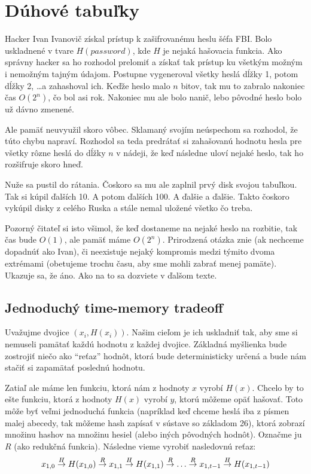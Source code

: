 \section{Dúhové tabuľky}

Hacker Ivan Ivanovič získal prístup k zašifrovanému heslu šéfa FBI.
Bolo uskladnené v tvare $H(password)$, kde $H$ je nejaká hašovacia funkcia.
Ako správny hacker sa ho rozhodol prelomiť a získať tak prístup
ku všetkým možným i nemožným tajným údajom.
Postupne vygeneroval všetky heslá dĺžky 1, potom dĺžky 2, \dots a
zahashoval ich.
Keďže heslo malo $n$ bitov, tak mu to zabralo nakoniec čas $O(2^n)$,
čo bol asi rok. Nakoniec mu ale bolo nanič, lebo pôvodné heslo bolo už
dávno zmenené.

Ale pamäť neuvyužil skoro vôbec.
Sklamaný svojím neúspechom sa rozhodol, že túto chybu napraví.
Rozhodol sa teda predrátať si zahašovanú hodnotu hesla
pre všetky rôzne heslá do dĺžky $n$ v nádeji,
že keď následne uloví nejaké heslo, tak ho rozšifruje skoro hneď.

Nuže sa pustil do rátania. Čoskoro sa mu ale zaplnil prvý disk svojou tabuľkou.
Tak si kúpil ďalších 10. A potom ďalších 100. A ďalšie a ďalšie.
Takto čoskoro vykúpil disky z celého Ruska
a stále nemal uložené všetko čo treba.

Pozorný čitateľ si isto všimol, že keď dostaneme na nejaké heslo na rozbitie,
tak čas bude $O(1)$, ale pamäť máme $O(2^n)$.
Prirodzená otázka znie (ak nechceme dopadnúť ako Ivan),
či neexistuje nejaký kompromis medzi týmito dvoma extrémami
(obetujeme trochu času, aby sme mohli zabrať menej pamäte).
Ukazuje sa, že áno. Ako na to sa dozviete v ďalšom texte.

\subsection{Jednoduchý time-memory tradeoff}

Uvažujme dvojice $(x_i, H(x_i))$.
Našim cieľom je ich uskladniť tak, aby sme si nemuseli
pamätať každú hodnotu z každej dvojice. 
Základná myšlienka bude zostrojiť niečo ako ``reťaz'' hodnôt, ktorá
bude deterministicky určená a bude nám stačiť si zapamätať poslednú
hodnotu.

Zatiaľ ale máme len funkciu, ktorá nám z hodnoty $x$ vyrobí $H(x)$.
Chcelo by to ešte funkciu, ktorá z hodnoty $H(x)$ vyrobí $y$,
ktorú môžeme opäť hašovať.
Toto môže byť veľmi jednoduchá funkcia (napríklad keď chceme heslá iba
z písmen malej abecedy, tak môžeme hash zapísať v sústave so základom 26),
ktorá zobrazí množinu hashov na množinu hesiel (alebo iných pôvodných hodnôt).
Označme ju $R$ (ako redukčná funkcia).
Následne vieme vyrobiť nasledovnú reťaz:
\begin{equation*}
    x_{1,0} \toa{H} H(x_{1,0}) \toa{R} 
    x_{1,1} \toa{H} H(x_{1,1}) \toa{R} \dots \toa{R} 
    x_{1,t-1} \toa{H} H(x_{1,t-1})
\end{equation*}

